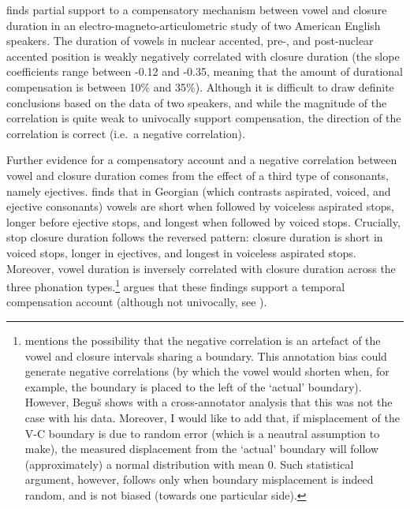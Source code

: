 \documentclass[12pt,]{article}
\let\rmarkdownfootnote\footnote%
\def\footnote{\protect\rmarkdownfootnote}
\begin{document}
\citet{de-jong1991} finds partial support to a compensatory mechanism
between vowel and closure duration in an electro-magneto-articulometric
study of two American English speakers. The duration of vowels in
nuclear accented, pre-, and post-nuclear accented position is weakly
negatively correlated with closure duration (the slope coefficients
range between -0.12 and -0.35, meaning that the amount of durational
compensation is between 10\% and 35\%). Although it is difficult to draw
definite conclusions based on the data of two speakers, and while the
magnitude of the correlation is quite weak to univocally support
compensation, the direction of the correlation is correct (i.e.~a
negative correlation).

Further evidence for a compensatory account and a negative correlation
between vowel and closure duration comes from the effect of a third type
of consonants, namely ejectives. \citet{begus2017} finds that in
Georgian (which contrasts aspirated, voiced, and ejective consonants)
vowels are short when followed by voiceless aspirated stops, longer
before ejective stops, and longest when followed by voiced stops.
Crucially, stop closure duration follows the reversed pattern: closure
duration is short in voiced stops, longer in ejectives, and longest in
voiceless aspirated stops. Moreover, vowel duration is inversely
correlated with closure duration across the three phonation
types.\footnote{\citet{begus2017} mentions the possibility that the negative correlation is an artefact of the vowel and closure intervals sharing a boundary. This annotation bias could generate negative correlations (by which the vowel would shorten when, for example, the boundary is placed to the left of the `actual' boundary). However, Beguš shows with a cross-annotator analysis that this was not the case with his data. Moreover, I would like to add that, if misplacement of the V-C boundary is due to random error (which is a neautral assumption to make), the measured displacement from the `actual' boundary will follow (approximately) a normal distribution with mean 0. Such statistical argument, however, follows only when boundary misplacement is indeed random, and is not biased (towards one particular side).}
\citet{begus2017} argues that these findings support a temporal
compensation account (although not univocally, see
\citealt[Section V]{begus2017}).
\end{document}

